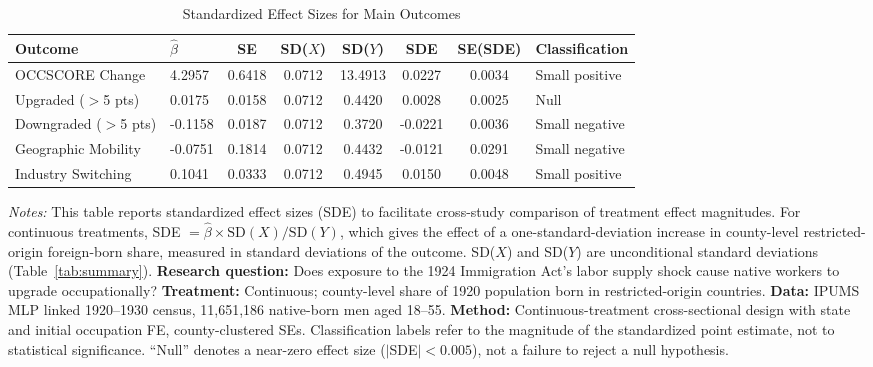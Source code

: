 \begin{table}[H]
\centering
\caption{Standardized Effect Sizes for Main Outcomes}
\label{tab:sde}
\begin{adjustbox}{max width=\textwidth}
\begin{tabular}{llcccccl}
\toprule
Outcome & $\hat{\beta}$ & SE & SD($X$) & SD($Y$) & SDE & SE(SDE) & Classification \\
\midrule
OCCSCORE Change & 4.2957 & 0.6418 & 0.0712 & 13.4913 & 0.0227 & 0.0034 & Small positive \\
Upgraded ($>$5 pts) & 0.0175 & 0.0158 & 0.0712 & 0.4420 & 0.0028 & 0.0025 & Null \\
Downgraded ($>$5 pts) & -0.1158 & 0.0187 & 0.0712 & 0.3720 & -0.0221 & 0.0036 & Small negative \\
Geographic Mobility & -0.0751 & 0.1814 & 0.0712 & 0.4432 & -0.0121 & 0.0291 & Small negative \\
Industry Switching & 0.1041 & 0.0333 & 0.0712 & 0.4945 & 0.0150 & 0.0048 & Small positive \\
\bottomrule
\end{tabular}
\end{adjustbox}
\par\vspace{0.3em}
{\footnotesize \emph{Notes:} This table reports standardized effect sizes (SDE) to facilitate cross-study comparison of treatment effect magnitudes. For continuous treatments, SDE $= \hat{\beta} \times \text{SD}(X) / \text{SD}(Y)$, which gives the effect of a one-standard-deviation increase in county-level restricted-origin foreign-born share, measured in standard deviations of the outcome. SD($X$) and SD($Y$) are unconditional standard deviations (Table~\ref{tab:summary}). \textbf{Research question:} Does exposure to the 1924 Immigration Act's labor supply shock cause native workers to upgrade occupationally? \textbf{Treatment:} Continuous; county-level share of 1920 population born in restricted-origin countries. \textbf{Data:} IPUMS MLP linked 1920--1930 census, 11,651,186 native-born men aged 18--55. \textbf{Method:} Continuous-treatment cross-sectional design with state and initial occupation FE, county-clustered SEs. Classification labels refer to the magnitude of the standardized point estimate, not to statistical significance. ``Null'' denotes a near-zero effect size ($|$SDE$| < 0.005$), not a failure to reject a null hypothesis.}
\end{table}
